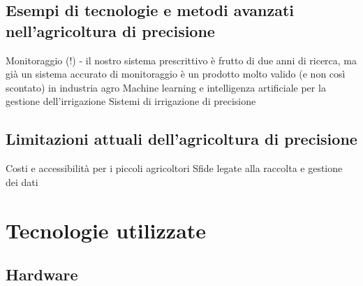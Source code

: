 \documentclass[12pt,a4paper,openright,twoside]{book}
\begin{document}
\section{Esempi di tecnologie e metodi avanzati nell’agricoltura di precisione}
\label{esempi-tecnologie}
Monitoraggio (!) - il nostro sistema prescrittivo è frutto di due anni di ricerca, ma già un sistema accurato di monitoraggio è un prodotto molto valido (e non così scontato) in industria agro
Machine learning e intelligenza artificiale per la gestione dell'irrigazione
Sistemi di irrigazione di precisione

\section{Limitazioni attuali dell’agricoltura di precisione}
\label{limiti}
Costi e accessibilità per i piccoli agricoltori
Sfide legate alla raccolta e gestione dei dati


\chapter{Tecnologie utilizzate}




\section{Hardware}
\end{document}
